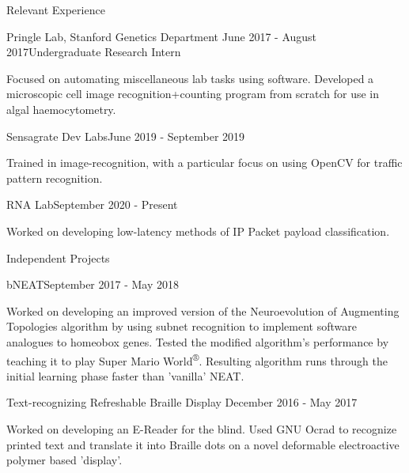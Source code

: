 \documentclass{resume} %
\begin{document}
\begin{resumeSection}{Relevant Experience}

\begin{resumeSubsection}{Pringle Lab, Stanford Genetics Department}
	{June 2017 - August 2017}{Undergraduate Research Intern}{}
\item Focused on automating miscellaneous lab tasks using software. Developed a 
	microscopic cell image recognition+counting program from scratch for
	use in algal haemocytometry. 
\end{resumeSubsection}
\begin{resumeSubsection}{Sensagrate Dev Labs}{June 2019 - September 2019}{}{}
\item Trained in image-recognition, with a particular focus on using OpenCV for
	traffic pattern recognition. 
\end{resumeSubsection}
\begin{resumeSubsection}{RNA Lab}{September 2020 - Present}{}{}
\item Worked on developing low-latency methods of IP
Packet payload classification. 
\end{resumeSubsection}

\end{resumeSection}


\begin{resumeSection}{Independent Projects} \itemsep -2pt

\begin{resumeSubsection}{bNEAT}{September 2017 - May 2018}{}{}
\item Worked on developing an improved version of the Neuroevolution of
	Augmenting Topologies algorithm by using subnet recognition to
	implement software analogues to homeobox genes. Tested the modified
	algorithm's performance by teaching it to play Super Mario
	World\textsuperscript{®}. Resulting algorithm runs through the initial
	learning phase faster than 'vanilla' NEAT.
\end{resumeSubsection}
\begin{resumeSubsection}{Text-recognizing Refreshable Braille Display}
	{December 2016 - May 2017}{}{}
\item Worked on developing an E-Reader for the blind. Used GNU Ocrad to
	recognize printed text and translate it into Braille dots on a
	novel deformable electroactive polymer based 'display'. 
\end{resumeSubsection}

\end{resumeSection}
\end{document}
